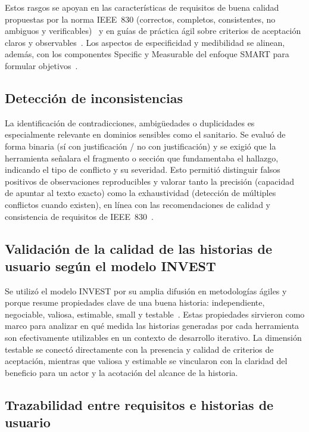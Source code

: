 Estos rasgos se apoyan en las características de requisitos de buena calidad propuestas por la norma IEEE~830 (correctos, completos, consistentes, no ambiguos y verificables)~\cite{ieee830} y en guías de práctica ágil sobre criterios de aceptación claros y observables~\cite{atlassian_acceptance_criteria,agile_business_requirements_user_stories}. Los aspectos de especificidad y medibilidad se alinean, además, con los componentes Specific y Measurable del enfoque SMART para formular objetivos~\cite{doran_smart}.

\subsection{Detección de inconsistencias}

La identificación de contradicciones, ambigüedades o duplicidades es especialmente relevante en dominios sensibles como el sanitario. Se evaluó de forma binaria (sí con justificación / no con justificación) y se exigió que la herramienta señalara el fragmento o sección que fundamentaba el hallazgo, indicando el tipo de conflicto y su severidad. Esto permitió distinguir falsos positivos de observaciones reproducibles y valorar tanto la precisión (capacidad de apuntar al texto exacto) como la exhaustividad (detección de múltiples conflictos cuando existen), en línea con las recomendaciones de calidad y consistencia de requisitos de IEEE~830~\cite{ieee830}.

\subsection{Validación de la calidad de las historias de usuario según el modelo INVEST}

Se utilizó el modelo INVEST por su amplia difusión en metodologías ágiles y porque resume propiedades clave de una buena historia: independiente, negociable, valiosa, estimable, small y testable~\cite{wake_invest,cohn_user_stories_applied}. Estas propiedades sirvieron como marco para analizar en qué medida las historias generadas por cada herramienta son efectivamente utilizables en un contexto de desarrollo iterativo. La dimensión testable se conectó directamente con la presencia y calidad de criterios de aceptación, mientras que valiosa y estimable se vincularon con la claridad del beneficio para un actor y la acotación del alcance de la historia.

\subsection{Trazabilidad entre requisitos e historias de usuario}


